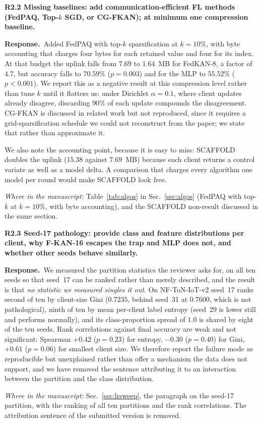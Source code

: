\documentclass[11pt]{article}
\newcommand{\rc}[1]{\medskip\noindent\textbf{\textcolor[rgb]{0.35,0.35,0.35}{#1}}\par\nopagebreak}
\newcommand{\reply}{\medskip\noindent\textbf{Response.}\ }
\newcommand{\where}[1]{\par\smallskip\noindent\emph{Where in the manuscript:} #1\par}
\begin{document}
\rc{R2.2 Missing baselines: add communication-efficient FL methods (FedPAQ, Top-$k$
SGD, or CG-FKAN); at minimum one compression baseline.}
\reply Added FedPAQ with top-$k$ sparsification at $k=10\%$, with byte accounting that charges four
bytes for each retained value and four for its index. At that budget the uplink falls from
$7.69$ to $1.64$~MB for FedKAN-8, a factor of $4.7$, but accuracy falls to $70.59\%$
($p=0.003$) and for the MLP to $55.52\%$ ($p<0.001$). We report this as a negative result at
this compression level rather than tune $k$ until it flatters us: under Dirichlet
$\alpha=0.1$, where client updates already disagree, discarding $90\%$ of each update
compounds the disagreement. CG-FKAN is discussed in related work but not reproduced, since it
requires a grid-sparsification schedule we could not reconstruct from the paper; we state that
rather than approximate it.

We also note the accounting point, because it is easy to miss: SCAFFOLD doubles the uplink
($15.38$ against $7.69$~MB) because each client returns a control variate as well as a model
delta. A comparison that charges every algorithm one model per round would make SCAFFOLD look
free.
\where{Table~\ref{tab:algos} in Sec.~\ref{sec:algos} (FedPAQ with top-$k$ at $k=10\%$, with byte accounting), and the SCAFFOLD non-result discussed in the same section.}

\rc{R2.3 Seed-17 pathology: provide class and feature distributions per client, why
F-KAN-16 escapes the trap and MLP does not, and whether other seeds behave similarly.}
\reply We measured the partition statistics the reviewer asks for, on all ten seeds so that seed~17
can be ranked rather than merely described, and the result is that \emph{no statistic we
measured singles it out}. On NF-ToN-IoT-v2 seed~17 ranks second of ten by client-size Gini
($0.7235$, behind seed~31 at $0.7600$, which is not pathological), ninth of ten by mean
per-client label entropy (seed~29 is lower still and performs normally), and its
class-proportion spread of $1.0$ is shared by eight of the ten seeds. Rank correlations against
final accuracy are weak and not significant: Spearman $+0.42$ ($p=0.23$) for entropy, $-0.30$
($p=0.40$) for Gini, $+0.61$ ($p=0.06$) for smallest client size. We therefore report the
failure mode as reproducible but unexplained rather than offer a mechanism the data does not
support, and we have removed the sentence attributing it to an interaction between the
partition and the class distribution.
\where{Sec.~\ref{sec:lrsweep}, the paragraph on the seed-17 partition, with the ranking of all ten partitions and the rank correlations. The attribution sentence of the submitted version is removed.}
\end{document}
